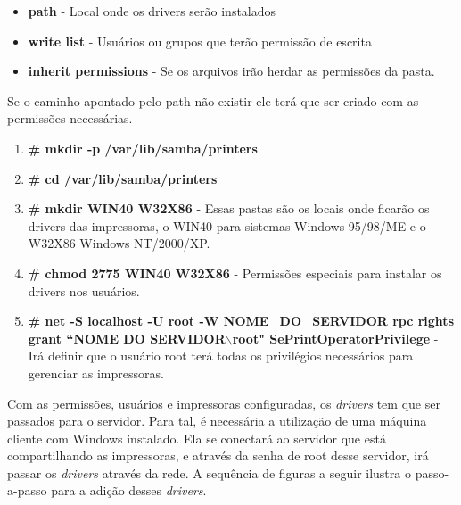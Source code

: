 \begin{itemize}
	\item \textbf{path} - Local onde os drivers serão instalados
	\item \textbf{write list} - Usuários ou grupos que terão permissão de escrita
	\item \textbf{inherit permissions} - Se os arquivos irão herdar as permissões da pasta.
\end{itemize}

Se o caminho apontado pelo path não existir ele terá que ser criado com as permissões necessárias.

\begin{enumerate}
	\item \textbf{\# mkdir -p /var/lib/samba/printers}
	
	\item \textbf{\# cd /var/lib/samba/printers}
	\item \textbf{\# mkdir WIN40 W32X86} - Essas pastas são os locais onde ficarão os drivers das impressoras, o WIN40 para sistemas Windows 95/98/ME e o W32X86 Windows NT/2000/XP.
	\item \textbf{\# chmod 2775 WIN40 W32X86} - Permissões especiais para instalar os drivers nos usuários.
	\item \textbf{\# net -S localhost -U root -W NOME\_DO\_SERVIDOR  rpc rights grant ``NOME DO SERVIDOR$\backslash$root" SePrintOperatorPrivilege} - Irá definir que o usuário root terá todas os privilégios necessários para gerenciar as impressoras.
\end{enumerate}

Com as permissões, usuários e impressoras configuradas, os \textit{drivers} tem que ser passados para o servidor. Para tal, é necessária a utilização de uma máquina cliente com Windows instalado. Ela se conectará ao servidor que está compartilhando as impressoras, e através da senha de root desse servidor, irá passar os \textit{drivers} através da rede. A sequência de figuras a seguir ilustra o passo-a-passo para a adição desses \textit{drivers}.

